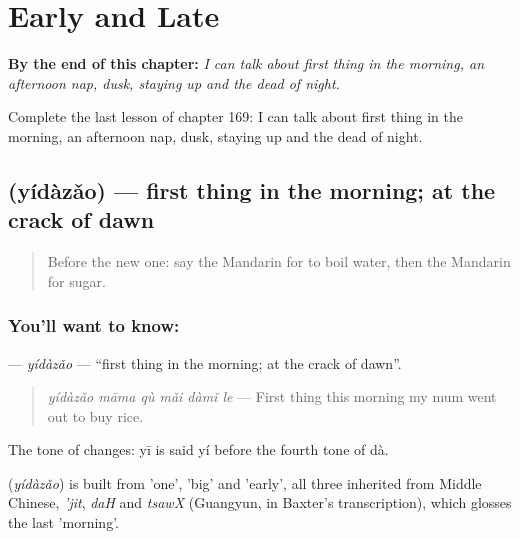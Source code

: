 
\chapter{Early and Late}
\label{ch:zh-early-and-late}

\begin{chapteropening}
\textbf{By the end of this chapter:} \emph{I can talk about first thing in the morning, an afternoon nap, dusk, staying up and the dead of night.}

Complete the last lesson of chapter 169: I can talk about first thing in the morning, an afternoon nap, dusk, staying up and the dead of night.
\end{chapteropening}

\section[\texorpdfstring{\zh{一大早} (yídàzǎo)}{一大早 (yídàzǎo)}]{ (yídàzǎo) — first thing in the morning; at the crack of dawn}

\label{lesson:ZH-C169-yidazao}



\begin{quote}
Before the new one: say the Mandarin for to boil water, then the Mandarin for sugar.
\end{quote}

\subsection*{You'll want to know: }
\textbf{} — \emph{yídàzǎo} — \textquotedblleft{}first thing in the morning; at the crack of dawn\textquotedblright{}.

\begin{quote}
\textbf{} \emph{yídàzǎo māma qù mǎi dàmǐ le} — First thing this morning my mum went out to buy rice.
\end{quote}

The tone of  changes: yī is said yí before the fourth tone of dà.

\begin{cousinweb}
\textbf{} (\emph{yídàzǎo}) is built from  'one',  'big' and  'early', all three inherited from Middle Chinese, \emph{'jit}, \emph{daH} and \emph{tsawX} (Guangyun, in Baxter's transcription), which glosses the last 'morning'.
\end{cousinweb}

